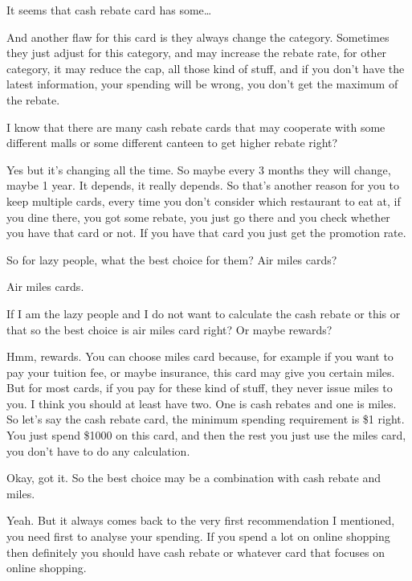 \begin{description}[leftmargin=4em,style=nextline]
	\item[JH:] It seems that cash rebate card has some…

	\item[HJ:] And another flaw for this card is they always change the category. Sometimes they just adjust for this category, and may increase the rebate rate, for other category, it may reduce the cap, all those kind of stuff, and if you don’t have the latest information, your spending will be wrong, you don’t get the maximum of the rebate.

	\item[JH:] I know that there are many cash rebate cards that may cooperate with some different malls or some different canteen to get higher rebate right?

	\item[HJ:] Yes but it’s changing all the time. So maybe every 3 months they will change, maybe 1 year. It depends, it really depends. So that’s another reason for you to keep multiple cards, every time you don’t consider which restaurant to eat at, if you dine there, you got some rebate, you just go there and you check whether you have that card or not. If you have that card you just get the promotion rate.

	\item[JH:] So for lazy people, what the best choice for them? Air miles cards?

	\item[HJ:] Air miles cards.

	\item[JH:] If I am the lazy people and I do not want to calculate the cash rebate or this or that so the best choice is air miles card right? Or maybe rewards?

	\item[HJ:] Hmm, rewards. You can choose miles card because, for example if you want to pay your tuition fee, or maybe insurance, this card may give you certain miles. But for most cards, if you pay for these kind of stuff, they never issue miles to you. I think you should at least have two. One is cash rebates and one is miles. So let’s say the cash rebate card, the minimum spending requirement is \$1 right. You just spend \$1000 on this card, and then the rest you just use the miles card, you don’t have to do any calculation.

	\item[JH:] Okay, got it. So the best choice may be a combination with cash rebate and miles.

	\item[HJ:] Yeah. But it always comes back to the very first recommendation I mentioned, you need first to analyse your spending. If you spend a lot on online shopping then definitely you should have cash rebate or whatever card that focuses on online shopping.


\end{description}

